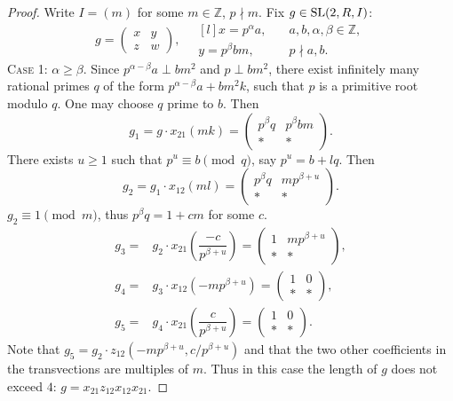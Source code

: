 \begin{proof}
Write $I=(m)$ for some $m\in\mathbb{Z}$, $p\nmid m$. Fix $g\in\operatorname{SL}(2,R,I)$:
\[ g=\begin{pmatrix}x & y \\ z & w\end{pmatrix},\quad
\begin{matrix*}[l]
x=p^\alpha a,\quad & a,b,\alpha,\beta\in\mathbb{Z}, \\ y=p^\beta bm, & p\nmid a,b.
\end{matrix*}\]
\textsc{Case 1:} $\alpha\geqslant\beta$. Since $p^{\alpha-\beta}a\perp bm^2$ and $p\perp bm^2$, there exist infinitely many rational primes $q$ of the form $p^{\alpha-\beta}a+bm^2k$, such that $p$ is a primitive root modulo $q$. One may choose $q$ prime to $b$. Then
\[ g_1=g\cdot x_{21}(mk) =
\begin{pmatrix} p^\beta q & p^\beta bm \\ * & * \end{pmatrix}.\]
There exists $u\geqslant 1$ such that $p^u\equiv b\pmod q$, say $p^u=b+lq$. Then
\[ g_2 = g_1\cdot x_{12}(ml) =
\begin{pmatrix} p^\beta q & mp^{\beta+u} \\ * & * \end{pmatrix}. \]
$g_2\equiv 1\pmod m$, thus $p^\beta q=1+cm$ for some $c$.
\begin{align*}
g_3 = & g_2\cdot x_{21}\left(\dfrac{-c}{p^{\beta+u}}\right) =
\begin{pmatrix} 1 & mp^{\beta+u} \\ * & * \end{pmatrix}, \\
g_4 = & g_3\cdot x_{12}\left(-mp^{\beta+u}\right) =
\begin{pmatrix} 1 & 0 \\ * & * \end{pmatrix}, \\
g_5 = & g_4\cdot x_{21}\left(\dfrac{c}{p^{\beta+u}}\right) =
\begin{pmatrix} 1 & 0 \\ * & * \end{pmatrix}.
\end{align*}
Note that $g_5=g_2\cdot z_{12}\left(-mp^{\beta+u},c/p^{\beta+u}\right)$ and that the two other coefficients in the transvections are multiples of $m$. Thus in this case the length of $g$ does not exceed $4$: $g=x_{21}z_{12}x_{12}x_{21}$.


\end{proof}
